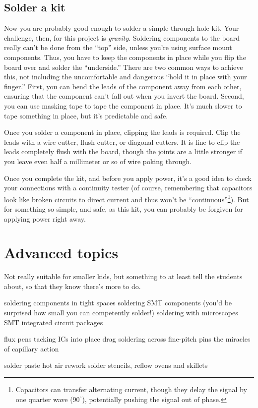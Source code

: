 \documentclass[12pt]{article}
\begin{document}
\subsection{Solder a kit}

Now you are probably good enough to solder a simple through-hole kit. Your challenge, then, for this project is \emph{gravity}. Soldering components to the board really can't be done from the ``top'' side, unless you're using surface mount components. Thus, you have to keep the components in place while you flip the board over and solder the ``underside.'' There are two common ways to achieve this, not including the uncomfortable and dangerous ``hold it in place with your finger.'' First, you can bend the leads of the component away from each other, ensuring that the component can't fall out when you invert the board. Second, you can use masking tape to tape the component in place. It's much slower to tape something in place, but it's predictable and safe.

Once you solder a component in place, clipping the leads is required. Clip the leads with a wire cutter, flush cutter, or diagonal cutters. It is fine to clip the leads completely flush with the board, though the joints are a little stronger if you leave even half a millimeter or so of wire poking through. 

Once you complete the kit, and before you apply power, it's a good idea to check your connections with a continuity tester (of course, remembering that capacitors look like broken circuits to direct current and thus won't be ``continuous''\footnote{Capacitors can transfer alternating current, though they delay the signal by one quarter wave ($90^{\circ}$), potentially pushing the signal out of phase.}). But for something so simple, and safe, as this kit, you can probably be forgiven for applying power right away.

\section{Advanced topics}

Not really suitable for smaller kids, but something to at least tell the students about, so that they know there's more to do.

\begin{enumerate}
\+ soldering components in tight spaces
\+ soldering SMT components (you'd be surprised how small you can competently solder!)
\+ soldering with microscopes
\+ SMT integrated circuit packages
	\begin{itemize}
	\+ flux pens
	\+ tacking ICs into place
	\+ drag soldering across fine-pitch pins
	\+ the miracles of capillary action
	\end{itemize}
\+ solder paste
\+ hot air rework
\+ solder stencils, reflow ovens and skillets
\end{enumerate}
\end{document}
